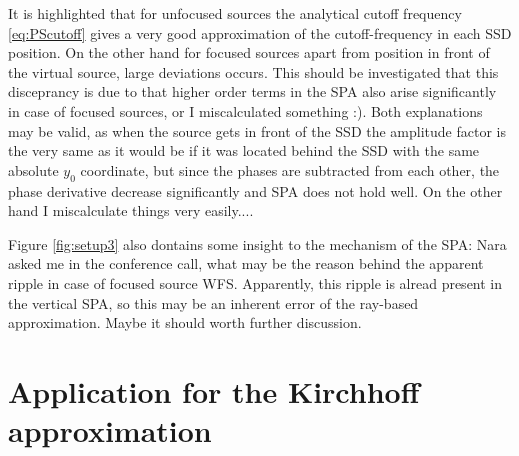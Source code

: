 \documentclass[11pt]{article}
\begin{document}
It is highlighted that for unfocused sources the analytical cutoff frequency \eqref{eq:PScutoff} gives a very good approximation of the cutoff-frequency in each SSD position.
On the other hand for focused sources apart from position in front of the virtual source, large deviations occurs.
This should be investigated that this disceprancy is due to that higher order terms in the SPA also arise significantly in case of focused sources, or I miscalculated something :).
Both explanations may be valid, as when the source gets in front of the SSD the amplitude factor is the very same as it would be if it was located behind the SSD with the same absolute $y_0$ coordinate, but since the phases are subtracted from each other, the phase derivative decrease significantly and SPA does not hold well.
On the other hand I miscalculate things very easily....

Figure \ref{fig:setup3} also dontains some insight to the mechanism of the SPA: Nara asked me in the conference call, what may be the reason behind the apparent ripple in case of focused source WFS.
Apparently, this ripple is alread present in the vertical SPA, so this may be an inherent error of the ray-based approximation. 
Maybe it should worth further discussion.

\section{Application for the Kirchhoff approximation}



\end{document}
